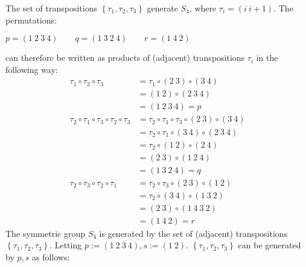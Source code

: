 \documentclass{article}
\begin{document}
\problem
{}
The set of transpositions $\left\{\tau_1,\tau_2,\tau_3\right\}$ generate $S_4$, where $\tau_i = \left(i~ i+1\right)$. The permutations:
\begin{center}
    $p = \left(1~2~3~4\right)
    \qquad
    q = \left(1~3~2~4\right)
    \qquad
    r = \left(1~4~2\right)
    $
\end{center}
can therefore be written as products of (adjacent) transpositions $\tau_i$ in the following way:
\begin{equation}
    \begin{split}
        \tau_1 \circ \tau_2 \circ \tau_3 & = \tau_1 \circ \left(2~3\right) \circ \left(3~4\right) \\
        & = \left(1~2\right) \circ \left(2~3~4\right) \\
        & = \left(1~2~3~4\right) = p \\
        \tau_2 \circ \tau_1 \circ \tau_3 \circ \tau_2 \circ \tau_3 & = \tau_2 \circ \tau_1 \circ \tau_3 \circ \left(2~3\right) \circ \left(3~4\right) \\
        & = \tau_2 \circ \tau_1 \circ \left(3~4\right) \circ \left(2~3~4\right) \\
        & = \tau_2 \circ \left(1~2\right) \circ \left(2~4\right) \\
        & = \left(2~3\right) \circ \left(1~2~4\right) \\
        & = \left(1~3~2~4\right) = q \\
        \tau_2 \circ \tau_3 \circ \tau_2 \circ \tau_1 & = \tau_2 \circ \tau_3 \circ \left(2~3\right) \circ \left(1~2\right) \\
        & = \tau_2 \circ \left(3~4\right) \circ \left(1~3~2\right) \\
        & = \left(2~3\right) \circ \left(1~4~3~2\right) \\
        & = \left(1~4~2\right) = r
    \end{split}
\end{equation} 
The symmetric group $S_4$ is generated by the set of (adjacent) transpositions $\left\{\tau_1, \tau_2, \tau_3\right\}$. Letting $p := \left(1~2~3~4\right), s := \left(1~2\right)$. $\left\{\tau_1, \tau_2, \tau_3\right\}$ can be generated by $p, s$ as follows:
\end{document}
